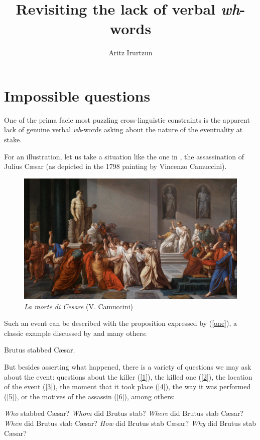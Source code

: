 \documentclass[output=paper]{langsci/langscibook}
\author{Aritz Irurtzun\affiliation{CNRS-IKER (UMR 5478)}}
\title{Revisiting the lack of verbal \textit{wh}-words}
\begin{document}
\glsresetall

\section{Impossible questions}\largerpage

One of the prima facie most puzzling cross-linguistic constraints is the
apparent lack of genuine verbal \emph{wh}-words asking about the nature of the
eventuality at stake.

For an illustration, let us take a situation like the one in , the
assassination of Julius C\ae{}sar (as depicted in the 1798 painting by Vincenzo
Camuccini).

\begin{figure}[H]
\centering
\includegraphics[width=.575\textwidth,keepaspectratio=true]{./img/15.png}
\caption{\emph{La morte di Cesare} (V. Camuccini)\label{fig:15:1}}
\end{figure}

Such an event can be described with the proposition expressed by (\ref{one}), a
classic example discussed by \citet{Davidson1967} and many others:

\begin{exe}
\ex \label{one} Brutus stabbed C\ae{}sar.
\end{exe}

But besides asserting what happened, there is a variety of questions we may ask
about the event: questions about the killer (\ref{1}), the killed one
(\ref{2}), the location of the event (\ref{3}), the moment that it took place
(\ref{4}), the way it was performed (\ref{5}), or the motives of the assassin
(\ref{6}), among others:

\begin{exe}
\ex \label{1} \emph{Who} stabbed C\ae{}sar?
\ex \label{2} \emph{Whom} did Brutus stab?
\ex \label{3} \emph{Where} did Brutus stab C\ae{}sar?
\ex \label{4} \emph{When} did Brutus stab C\ae{}sar?
\ex \label{5} \emph{How} did Brutus stab C\ae{}sar?
\ex \label{6} \emph{Why} did Brutus stab C\ae{}sar?
\end{exe}
\end{document}
